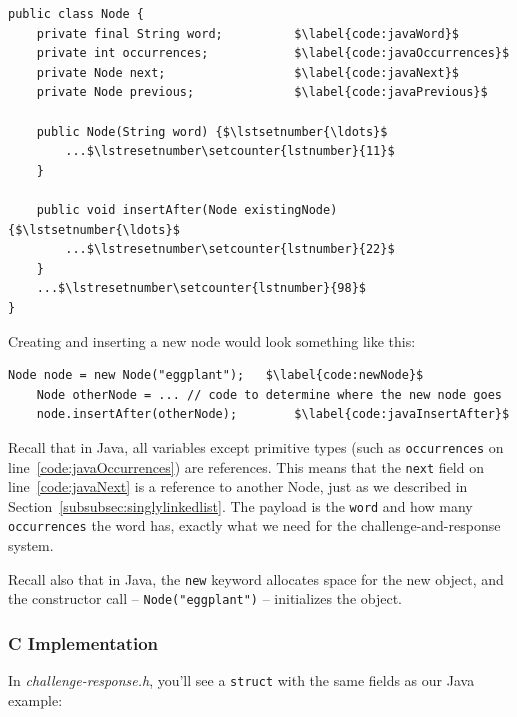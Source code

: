 \begin{lstlisting}[mathescape=true]
public class Node {
    private final String word;          $\label{code:javaWord}$
    private int occurrences;            $\label{code:javaOccurrences}$
    private Node next;                  $\label{code:javaNext}$
    private Node previous;              $\label{code:javaPrevious}$

    public Node(String word) {$\lstsetnumber{\ldots}$
        ...$\lstresetnumber\setcounter{lstnumber}{11}$
    }

    public void insertAfter(Node existingNode) {$\lstsetnumber{\ldots}$
        ...$\lstresetnumber\setcounter{lstnumber}{22}$
    }
    ...$\lstresetnumber\setcounter{lstnumber}{98}$
}
\end{lstlisting}

Creating and inserting a new node would look something like this:

\begin{lstlisting}[firstnumber=200, mathescape=true]
    Node node = new Node("eggplant");   $\label{code:newNode}$
    Node otherNode = ... // code to determine where the new node goes
    node.insertAfter(otherNode);        $\label{code:javaInsertAfter}$
\end{lstlisting}

Recall that in Java, all variables except primitive types (such as \lstinline{occurrences} on line~\ref{code:javaOccurrences}) are references.
This means that the \lstinline{next} field on line~\ref{code:javaNext} is a reference to another Node, just as we described in Section~\ref{subsubsec:singlylinkedlist}.
The payload is the \lstinline{word} and how many \lstinline{occurrences} the word has, exactly what we need for the challenge-and-response system.

Recall also that in Java, the \lstinline{new} keyword allocates space for the new object, and the constructor call -- \lstinline{Node("eggplant")} -- initializes the object.

\subsubsection{C Implementation} \label{subsubsec:cImplementation}

In \textit{challenge-response.h}, you'll see a \lstinline{struct} with the same fields as our Java example:



